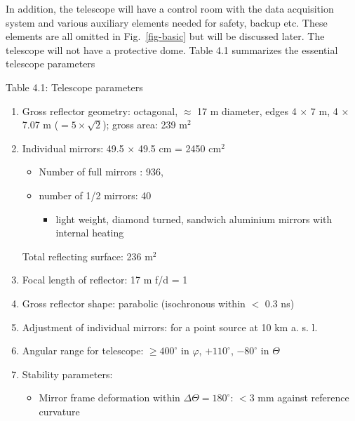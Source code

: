 In addition, the telescope will have a control room with the data
acquisition system and various auxiliary elements needed for safety, backup
etc. These elements are all omitted in Fig.~\ref{fig-basic} but will be discussed
later. The telescope will not have a protective dome. Table 4.1 summarizes
the essential telescope parameters

\vspace{0.4cm}
Table 4.1: Telescope parameters
\begin{enumerate}
\item  Gross reflector geometry: octagonal, $\approx $ 17 m diameter, edges 4 $%
\times $ 7 m, 4 $\times $ 7.07 m ($=5\times \sqrt{2}$); gross area: 239 m$^{2}
$

\item  Individual mirrors: 49.5 $\times $ 49.5 cm = 2450 cm$^{2}$

\begin{itemize}
\item  Number of full mirrors : 936,

\item  number of 1/2 mirrors: 40

\begin{itemize}
\item  light weight, diamond turned, sandwich aluminium mirrors with
internal heating
\end{itemize}
\end{itemize}

Total reflecting surface: 236 m$^2$

\item  Focal length of reflector: 17 m\newline
f/d = 1

\item  Gross reflector shape: parabolic (isochronous within $<$ 0.3 ns)

\item  Adjustment of individual mirrors: for a point source at 10 km a. s. l.

\item  Angular range for telescope: $\geq 400^{\circ }$ in $\varphi $, $%
+110^{\circ }$, $-80^{\circ }$ in $\Theta $

\item  Stability parameters:

\begin{itemize}
\item  Mirror frame deformation within $\Delta \Theta =180^{\circ }$: $<3$ mm 
against reference curvature


\end{itemize}
\end{enumerate}
